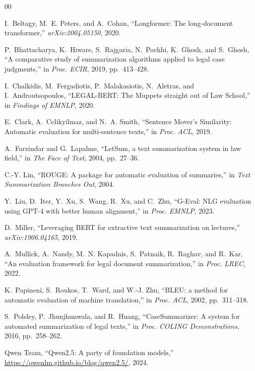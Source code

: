 \documentclass[conference,a4paper]{IEEEtran}
\begin{document}
\begin{thebibliography}{00}

I.~Beltagy, M.~E. Peters, and A.~Cohan, ``Longformer: The long-document transformer,'' \textit{arXiv:2004.05150}, 2020.

P.~Bhattacharya, K.~Hiware, S.~Rajgaria, N.~Pochhi, K.~Ghosh, and S.~Ghosh, ``A comparative study of summarization algorithms applied to legal case judgments,'' in \textit{Proc. ECIR}, 2019, pp.~413--428.

I.~Chalkidis, M.~Fergadiotis, P.~Malakasiotis, N.~Aletras, and I.~Androutsopoulos, ``LEGAL-BERT: The Muppets straight out of Law School,'' in \textit{Findings of EMNLP}, 2020.

E.~Clark, A.~Celikyilmaz, and N.~A. Smith, ``Sentence Mover's Similarity: Automatic evaluation for multi-sentence texts,'' in \textit{Proc. ACL}, 2019.

A.~Farzindar and G.~Lapalme, ``LetSum, a text summarization system in law field,'' in \textit{The Face of Text}, 2004, pp.~27--36.

C.-Y. Lin, ``ROUGE: A package for automatic evaluation of summaries,'' in \textit{Text Summarization Branches Out}, 2004.

Y.~Liu, D.~Iter, Y.~Xu, S.~Wang, R.~Xu, and C.~Zhu, ``G-Eval: NLG evaluation using GPT-4 with better human alignment,'' in \textit{Proc. EMNLP}, 2023.

D.~Miller, ``Leveraging BERT for extractive text summarization on lectures,'' \textit{arXiv:1906.04165}, 2019.

A.~Mullick, A.~Nandy, M.~N. Kapadnis, S.~Patnaik, R.~Raghav, and R.~Kar, ``An evaluation framework for legal document summarization,'' in \textit{Proc. LREC}, 2022.

K.~Papineni, S.~Roukos, T.~Ward, and W.-J. Zhu, ``BLEU: a method for automatic evaluation of machine translation,'' in \textit{Proc. ACL}, 2002, pp.~311--318.

S.~Polsley, P.~Jhunjhunwala, and R.~Huang, ``CaseSummarizer: A system for automated summarization of legal texts,'' in \textit{Proc. COLING Demonstrations}, 2016, pp.~258--262.

Qwen Team, ``Qwen2.5: A party of foundation models,'' \url{https://qwenlm.github.io/blog/qwen2.5/}, 2024.


\end{thebibliography}
\end{document}
